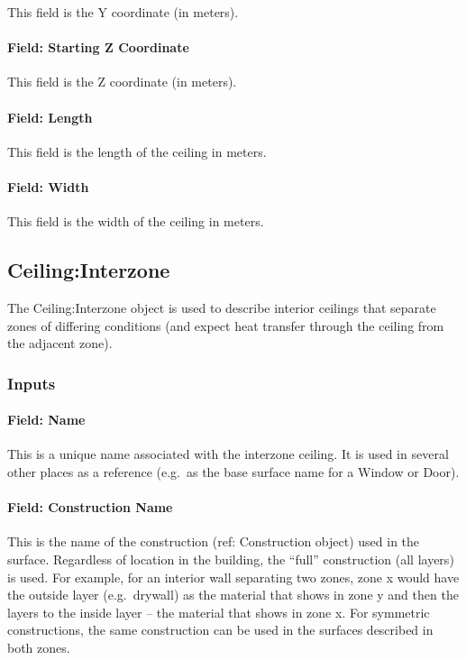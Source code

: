 This field is the Y coordinate (in meters).

\paragraph{Field: Starting Z Coordinate}\label{field-starting-z-coordinate-5}

This field is the Z coordinate (in meters).

\paragraph{Field: Length}\label{field-length-5}

This field is the length of the ceiling in meters.

\paragraph{Field: Width}\label{field-width-1}

This field is the width of the ceiling in meters.

\subsection{Ceiling:Interzone}\label{ceilinginterzone}

The Ceiling:Interzone object is used to describe interior ceilings that separate zones of differing conditions (and expect heat transfer through the ceiling from the adjacent zone).

\subsubsection{Inputs}\label{inputs-10-022}

\paragraph{Field: Name}\label{field-name-6-024}

This is a unique name associated with the interzone ceiling. It is used in several other places as a reference (e.g.~as the base surface name for a Window or Door).

\paragraph{Field: Construction Name}\label{field-construction-name-6}

This is the name of the construction (ref: Construction object) used in the surface. Regardless of location in the building, the ``full'' construction (all layers) is used. For example, for an interior wall separating two zones, zone x would have the outside layer (e.g.~drywall) as the material that shows in zone y and then the layers to the inside layer -- the material that shows in zone x. For symmetric constructions, the same construction can be used in the surfaces described in both zones.


